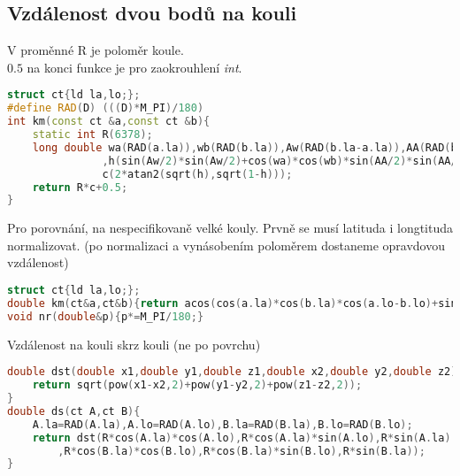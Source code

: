 \documentclass[11pt]{article}
\begin{document}
\subsection{Vzdálenost dvou bodů na kouli}
V proměnné \textsf{R} je poloměr koule.
\\$0.5$ na konci funkce je pro zaokrouhlení \textit{int}.
\begin{lstlisting}[language=C++]
struct ct{ld la,lo;};
#define RAD(D) (((D)*M_PI)/180)
int km(const ct &a,const ct &b){
    static int R(6378);
    long double wa(RAD(a.la)),wb(RAD(b.la)),Aw(RAD(b.la-a.la)),AA(RAD(b.lo-a.lo))
               ,h(sin(Aw/2)*sin(Aw/2)+cos(wa)*cos(wb)*sin(AA/2)*sin(AA/2)),
               c(2*atan2(sqrt(h),sqrt(1-h)));
    return R*c+0.5;
}
\end{lstlisting}
Pro porovnání, na nespecifikovaně velké kouly. Prvně se musí latituda i longtituda normalizovat. (po normalizaci a vynásobením poloměrem dostaneme opravdovou vzdálenost)
\begin{lstlisting}[language=C++]
struct ct{ld la,lo;};
double km(ct&a,ct&b){return acos(cos(a.la)*cos(b.la)*cos(a.lo-b.lo)+sin(a.la)*sin(b.la));}
void nr(double&p){p*=M_PI/180;}
\end{lstlisting}
Vzdálenost na kouli skrz kouli (ne po povrchu)
\begin{lstlisting}[language=C++]
double dst(double x1,double y1,double z1,double x2,double y2,double z2){
    return sqrt(pow(x1-x2,2)+pow(y1-y2,2)+pow(z1-z2,2));
}
double ds(ct A,ct B){
    A.la=RAD(A.la),A.lo=RAD(A.lo),B.la=RAD(B.la),B.lo=RAD(B.lo);
    return dst(R*cos(A.la)*cos(A.lo),R*cos(A.la)*sin(A.lo),R*sin(A.la)
        ,R*cos(B.la)*cos(B.lo),R*cos(B.la)*sin(B.lo),R*sin(B.la));
}
\end{lstlisting}
\end{document}
